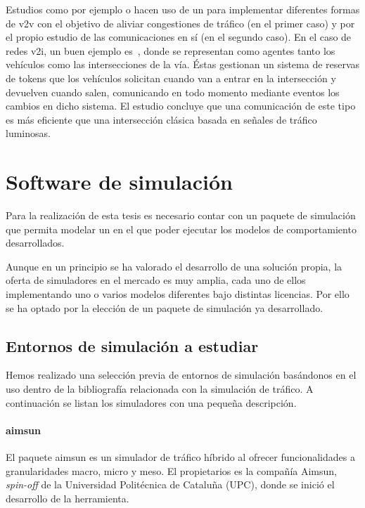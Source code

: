Estudios como por ejemplo \cite{Shiose2001} o \cite{Galis2000} hacen uso de un  para implementar diferentes formas de \gls{v2v} con el objetivo de aliviar congestiones de tráfico (en el primer caso) y por el propio estudio de las comunicaciones en sí (en el segundo caso). En el caso de redes \gls{v2i}, un buen ejemplo es~\cite{Dresner2004}, donde se representan como agentes tanto los vehículos como las intersecciones de la vía. Éstas gestionan un sistema de reservas de tokens que los vehículos solicitan cuando van a entrar en la intersección y devuelven cuando salen, comunicando en todo momento mediante eventos los cambios en dicho sistema. El estudio concluye que una comunicación de este tipo es más eficiente que una intersección clásica basada en señales de tráfico luminosas.

\section{Software de simulación}

Para la realización de esta tesis es necesario contar con un paquete de simulación que permita modelar un  en el que poder ejecutar los modelos de comportamiento desarrollados.

Aunque en un principio se ha valorado el desarrollo de una solución propia, la oferta de simuladores en el mercado es muy amplia, cada uno de ellos implementando uno o varios modelos diferentes bajo distintas licencias. Por ello se ha optado por la elección de un paquete de simulación ya desarrollado.

\subsection{Entornos de simulación a estudiar}

Hemos realizado una selección previa de entornos de simulación basándonos en el uso dentro de la bibliografía relacionada con la simulación de tráfico. A continuación se listan los simuladores con una pequeña descripción.

\paragraph{\gls{aimsun}}

El paquete \gls{aimsun} es un simulador de tráfico híbrido al ofrecer funcionalidades a granularidades macro, micro y meso. El propietarios es la compañía Aimsun, \textit{spin-off} de la Universidad Politécnica de Cataluña (UPC), donde se inició el desarrollo de la herramienta.


